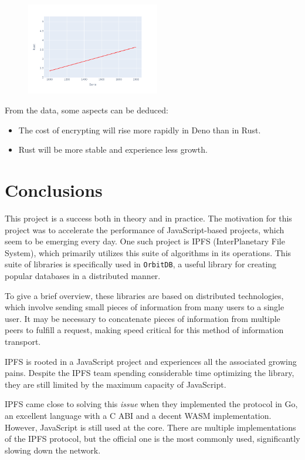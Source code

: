 \documentclass[12pt, letterpaper]{article}
\begin{document}
\begin{multicols}{2}
    \begin{figure}[H]
        \centering
        \includegraphics[width=0.52\textwidth]{images/trend_box_rust}
    \end{figure}

    From the data, some aspects can be deduced:
    \begin{itemize}
        \item The cost of encrypting will rise more rapidly in Deno than in Rust.
        \item Rust will be more stable and experience less growth.
    \end{itemize}

    \section{Conclusions}

    This project is a success both in theory and in practice. The motivation for this project was to accelerate the performance of JavaScript-based projects, which seem to be emerging every day. One such project is IPFS (InterPlanetary File System), which primarily utilizes this suite of algorithms in its operations. This suite of libraries is specifically used in \verb|OrbitDB|, a useful library for creating popular databases in a distributed manner.

    To give a brief overview, these libraries are based on distributed technologies, which involve sending small pieces of information from many users to a single user. It may be necessary to concatenate pieces of information from multiple peers to fulfill a request, making speed critical for this method of information transport.

    IPFS is rooted in a JavaScript project and experiences all the associated growing pains. Despite the IPFS team spending considerable time optimizing the library, they are still limited by the maximum capacity of JavaScript.

    IPFS came close to solving this \textit{issue} when they implemented the protocol in Go, an excellent language with a C ABI and a decent WASM implementation. However, JavaScript is still used at the core. There are multiple implementations of the IPFS protocol, but the official one is the most commonly used, significantly slowing down the network.


\end{multicols}
\end{document}
